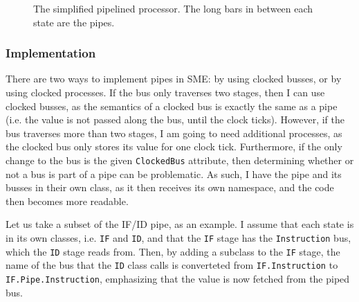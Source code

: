 \begin{figure}
{
    }
    \caption{The simplified pipelined processor. The long bars in between each
    state are the pipes.}
    \label{fig:pipes}
\end{figure}

\subsubsection*{Implementation}
There are two ways to implement pipes in SME: by using clocked busses, or by
using clocked processes. If the bus only traverses two stages, then I can use
clocked busses, as the semantics of a clocked bus is exactly the same as a
pipe (i.e. the value is not passed along the bus, until the clock ticks).
However, if the bus traverses more than two stages, I am going to need
additional processes, as the clocked bus only stores its value for one clock
tick. Furthermore, if the only change to the bus is the given
\texttt{ClockedBus} attribute, then determining whether or not a bus is part of
a pipe can be problematic. As such, I have the pipe and its busses in their own
class, as it then receives its own namespace, and the code then becomes more
readable.

Let us take a subset of the IF/ID pipe, as an example. I assume that each
state is in its own classes, i.e. \texttt{IF} and \texttt{ID}, and that the
\texttt{IF} stage has the \texttt{Instruction} bus, which the \texttt{ID} stage
reads from. Then, by adding a subclass to the \texttt{IF} stage, the name of
the bus that the \texttt{ID} class calls is converteted from
\texttt{IF.Instruction} to \texttt{IF.Pipe.Instruction}, emphasizing that the
value is now fetched from the piped bus.

